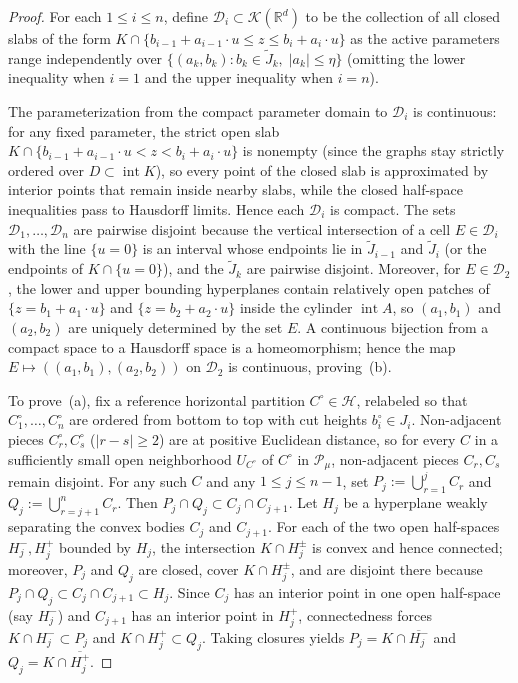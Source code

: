 \documentclass[11pt,a4paper]{amsart}
\numberwithin{equation}{section}
\theoremstyle{definition}
\newcommand{\R}{\mathbb{R}}
\newcommand{\Kcal}{\mathcal{K}}
\newcommand{\Pcal}{\mathcal{P}}
\newcommand{\Hcal}{\mathcal{H}}
\newcommand{\Dcal}{\mathcal{D}}
\newcommand{\inte}{\operatorname{int}}
\begin{document}
\begin{proof}
For each $1 \le i \le n$, define $\Dcal_i \subset \Kcal(\R^d)$ to be the collection of all closed slabs of the form $K \cap \{b_{i-1} + a_{i-1} \cdot u \le z \le b_i + a_i \cdot u\}$ as the active parameters range independently over $\{(a_k, b_k) : b_k \in \widetilde J_k,\; |a_k| \le \eta\}$ (omitting the lower inequality when $i = 1$ and the upper inequality when $i = n$).

The parameterization from the compact parameter domain to $\Dcal_i$ is continuous: for any fixed parameter, the strict open slab $K \cap \{b_{i-1} + a_{i-1} \cdot u < z < b_i + a_i \cdot u\}$ is nonempty (since the graphs stay strictly ordered over $D \subset \inte K$), so every point of the closed slab is approximated by interior points that remain inside nearby slabs, while the closed half-space inequalities pass to Hausdorff limits. Hence each $\Dcal_i$ is compact. The sets $\Dcal_1, \dots, \Dcal_n$ are pairwise disjoint because the vertical intersection of a cell $E \in \Dcal_i$ with the line $\{u = 0\}$ is an interval whose endpoints lie in $\widetilde J_{i-1}$ and $\widetilde J_i$ (or the endpoints of $K \cap \{u = 0\}$), and the $\widetilde J_k$ are pairwise disjoint. Moreover, for $E \in \Dcal_2$, the lower and upper bounding hyperplanes contain relatively open patches of $\{z = b_1 + a_1 \cdot u\}$ and $\{z = b_2 + a_2 \cdot u\}$ inside the cylinder $\inte A$, so $(a_1, b_1)$ and $(a_2, b_2)$ are uniquely determined by the set $E$. A continuous bijection from a compact space to a Hausdorff space is a homeomorphism; hence the map $E \mapsto ((a_1, b_1), (a_2, b_2))$ on $\Dcal_2$ is continuous, proving~(b).

To prove~(a), fix a reference horizontal partition $C^\circ \in \Hcal$, relabeled so that $C^\circ_1, \dots, C^\circ_n$ are ordered from bottom to top with cut heights $b^\circ_i \in J_i$. Non-adjacent pieces $C^\circ_r, C^\circ_s$ ($|r-s| \ge 2$) are at positive Euclidean distance, so for every $C$ in a sufficiently small open neighborhood $U_{C^\circ}$ of $C^\circ$ in $\Pcal_\mu$, non-adjacent pieces $C_r, C_s$ remain disjoint. For any such $C$ and any $1 \le j \le n-1$, set $P_j := \bigcup_{r=1}^j C_r$ and $Q_j := \bigcup_{r=j+1}^n C_r$. Then $P_j \cap Q_j \subset C_j \cap C_{j+1}$. Let $H_j$ be a hyperplane weakly separating the convex bodies $C_j$ and $C_{j+1}$. For each of the two open half-spaces $H_j^-, H_j^+$ bounded by $H_j$, the intersection $K \cap H_j^\pm$ is convex and hence connected; moreover, $P_j$ and $Q_j$ are closed, cover $K \cap H_j^\pm$, and are disjoint there because $P_j \cap Q_j \subset C_j \cap C_{j+1} \subset H_j$. Since $C_j$ has an interior point in one open half-space (say $H_j^-$) and $C_{j+1}$ has an interior point in $H_j^+$, connectedness forces $K \cap H_j^- \subset P_j$ and $K \cap H_j^+ \subset Q_j$. Taking closures yields $P_j = K \cap \overline{H_j^-}$ and $Q_j = K \cap \overline{H_j^+}$.


\end{proof}
\end{document}
